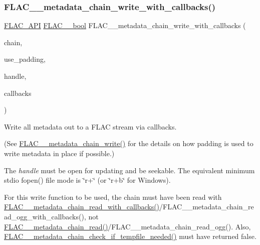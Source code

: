 \subsubsection{\texorpdfstring{F\+L\+A\+C\+\_\+\+\_\+metadata\+\_\+chain\+\_\+write\+\_\+with\+\_\+callbacks()}{FLAC\_\_metadata\_chain\_write\_with\_callbacks()}}
{\footnotesize\ttfamily \hyperlink{group__flac__export_ga56ca07df8a23310707732b1c0007d6f5}{F\+L\+A\+C\+\_\+\+A\+PI} \hyperlink{ordinals_8h_a95103469f1cbd78b8cf250194985b34e}{F\+L\+A\+C\+\_\+\+\_\+bool} F\+L\+A\+C\+\_\+\+\_\+metadata\+\_\+chain\+\_\+write\+\_\+with\+\_\+callbacks (\begin{DoxyParamCaption}\item[{\hyperlink{group__flac__metadata__level2_gaec6993c60b88f222a52af86f8f47bfdf}{F\+L\+A\+C\+\_\+\+\_\+\+Metadata\+\_\+\+Chain} $\ast$}]{chain,  }\item[{\hyperlink{ordinals_8h_a95103469f1cbd78b8cf250194985b34e}{F\+L\+A\+C\+\_\+\+\_\+bool}}]{use\+\_\+padding,  }\item[{\hyperlink{group__flac__callbacks_ga4c329c3168dee6e352384c5e9306260d}{F\+L\+A\+C\+\_\+\+\_\+\+I\+O\+Handle}}]{handle,  }\item[{\hyperlink{struct_f_l_a_c_____i_o_callbacks}{F\+L\+A\+C\+\_\+\+\_\+\+I\+O\+Callbacks}}]{callbacks }\end{DoxyParamCaption})}

Write all metadata out to a F\+L\+AC stream via callbacks.

(See \hyperlink{group__flac__metadata__level2_gaa15ead7230217de8e79f4af822cda490}{F\+L\+A\+C\+\_\+\+\_\+metadata\+\_\+chain\+\_\+write()} for the details on how padding is used to write metadata in place if possible.)

The {\itshape handle} must be open for updating and be seekable. The equivalent minimum stdio fopen() file mode is {\ttfamily \char`\"{}r+\char`\"{}} (or {\ttfamily \char`\"{}r+b\char`\"{}} for Windows).

For this write function to be used, the chain must have been read with \hyperlink{group__flac__metadata__level2_ga061ae21b7836cd26f13345b897f05f3e}{F\+L\+A\+C\+\_\+\+\_\+metadata\+\_\+chain\+\_\+read\+\_\+with\+\_\+callbacks()}/\+F\+L\+A\+C\+\_\+\+\_\+metadata\+\_\+chain\+\_\+read\+\_\+ogg\+\_\+with\+\_\+callbacks(), not \hyperlink{group__flac__metadata__level2_gadb7d8e9a82aeb43e256f0a948adf5c45}{F\+L\+A\+C\+\_\+\+\_\+metadata\+\_\+chain\+\_\+read()}/\+F\+L\+A\+C\+\_\+\+\_\+metadata\+\_\+chain\+\_\+read\+\_\+ogg(). Also, \hyperlink{group__flac__metadata__level2_ga29a124cceaffce5376d073a032bd1c52}{F\+L\+A\+C\+\_\+\+\_\+metadata\+\_\+chain\+\_\+check\+\_\+if\+\_\+tempfile\+\_\+needed()} must have returned {\ttfamily false}.


